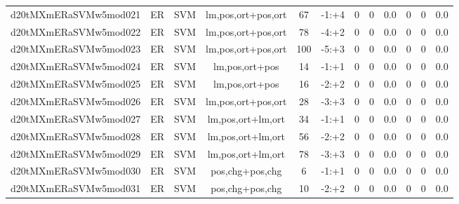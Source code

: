 \documentclass[a4paper]{article}
\begin{document}
\begin{landscape}
\begin{center}
\begin{tabular}{ |c|c|c|c|c|c|c|c|c|c|c|c|}
 
 	
 	\small{ d20tMXmERaSVMw5mod021 } & ER & SVM & lm,pos,ort+pos,ort  &  67 &  -1:+4  &  0 & 0 & 0.0  &  0 & 0 & 0.0 \\
 	

 
 	
 	\small{ d20tMXmERaSVMw5mod022 } & ER & SVM & lm,pos,ort+pos,ort  &  78 &  -4:+2  &  0 & 0 & 0.0  &  0 & 0 & 0.0 \\
 	

 
 	
 	\small{ d20tMXmERaSVMw5mod023 } & ER & SVM & lm,pos,ort+pos,ort  &  100 &  -5:+3  &  0 & 0 & 0.0  &  0 & 0 & 0.0 \\
 	

 
 	
 	\small{ d20tMXmERaSVMw5mod024 } & ER & SVM & lm,pos,ort+pos  &  14 &  -1:+1  &  0 & 0 & 0.0  &  0 & 0 & 0.0 \\
 	

 
 	
 	\small{ d20tMXmERaSVMw5mod025 } & ER & SVM & lm,pos,ort+pos  &  16 &  -2:+2  &  0 & 0 & 0.0  &  0 & 0 & 0.0 \\
 	

 
 	
 	\small{ d20tMXmERaSVMw5mod026 } & ER & SVM & lm,pos,ort+pos,ort  &  28 &  -3:+3  &  0 & 0 & 0.0  &  0 & 0 & 0.0 \\
 	

 
 	
 	\small{ d20tMXmERaSVMw5mod027 } & ER & SVM & lm,pos,ort+lm,ort  &  34 &  -1:+1  &  0 & 0 & 0.0  &  0 & 0 & 0.0 \\
 	

 
 	
 	\small{ d20tMXmERaSVMw5mod028 } & ER & SVM & lm,pos,ort+lm,ort  &  56 &  -2:+2  &  0 & 0 & 0.0  &  0 & 0 & 0.0 \\
 	

 
 	
 	\small{ d20tMXmERaSVMw5mod029 } & ER & SVM & lm,pos,ort+lm,ort  &  78 &  -3:+3  &  0 & 0 & 0.0  &  0 & 0 & 0.0 \\
 	

 
 	
 	\small{ d20tMXmERaSVMw5mod030 } & ER & SVM & pos,chg+pos,chg  &  6 &  -1:+1  &  0 & 0 & 0.0  &  0 & 0 & 0.0 \\
 	

 
 	
 	\small{ d20tMXmERaSVMw5mod031 } & ER & SVM & pos,chg+pos,chg  &  10 &  -2:+2  &  0 & 0 & 0.0  &  0 & 0 & 0.0 \\
 	

\end{tabular}
\end{center}
\end{landscape}
\end{document}
